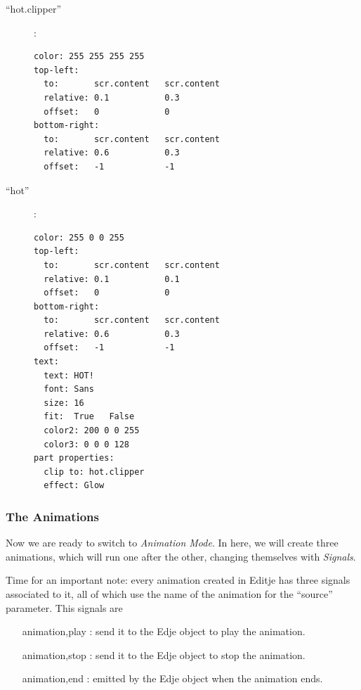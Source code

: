 \documentclass[a4paper]{profusion}
\begin{document}
\begin{description}
\item[``hot.clipper'']:
\begin{verbatim}
color: 255 255 255 255
top-left:
  to:       scr.content   scr.content
  relative: 0.1           0.3
  offset:   0             0
bottom-right:
  to:       scr.content   scr.content
  relative: 0.6           0.3
  offset:   -1            -1
\end{verbatim}
\item[``hot'']:
\begin{verbatim}
color: 255 0 0 255
top-left:
  to:       scr.content   scr.content
  relative: 0.1           0.1
  offset:   0             0
bottom-right:
  to:       scr.content   scr.content
  relative: 0.6           0.3
  offset:   -1            -1
text:
  text: HOT!
  font: Sans
  size: 16
  fit:  True   False
  color2: 200 0 0 255
  color3: 0 0 0 128
part properties:
  clip to: hot.clipper
  effect: Glow
\end{verbatim}
\end{description}

%
%
%
  \subsubsection{The Animations}

Now we are ready to switch to \emph{Animation Mode}. In here, we will
create three animations, which will run one after the other, changing
themselves with \emph{Signals}.

Time for an important note: every animation created in Editje has
three signals associated to it, all of which use the name of the
animation for the ``source'' parameter. This signals are
\begin{itemize}
\item[animation,play]: send it to the Edje object to play the
  animation.
\item[animation,stop]: send it to the Edje object to stop the
  animation.
\item[animation,end]: emitted by the Edje object when the animation
  ends.
\end{itemize}
\end{document}
